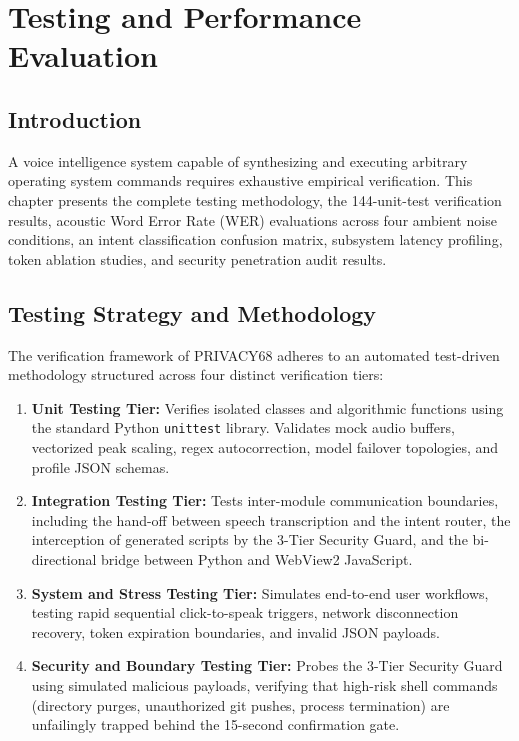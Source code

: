 \chapter{Testing and Performance Evaluation}
\label{ch:testing}

\section{Introduction}
A voice intelligence system capable of synthesizing and executing arbitrary operating system commands requires exhaustive empirical verification. This chapter presents the complete testing methodology, the 144-unit-test verification results, acoustic Word Error Rate (WER) evaluations across four ambient noise conditions, an intent classification confusion matrix, subsystem latency profiling, token ablation studies, and security penetration audit results.

\section{Testing Strategy and Methodology}
The verification framework of PRIVACY68 adheres to an automated test-driven methodology structured across four distinct verification tiers:
\begin{enumerate}
    \item \textbf{Unit Testing Tier:} Verifies isolated classes and algorithmic functions using the standard Python \texttt{unittest} library. Validates mock audio buffers, vectorized peak scaling, regex autocorrection, model failover topologies, and profile JSON schemas.
    \item \textbf{Integration Testing Tier:} Tests inter-module communication boundaries, including the hand-off between speech transcription and the intent router, the interception of generated scripts by the 3-Tier Security Guard, and the bi-directional bridge between Python and WebView2 JavaScript.
    \item \textbf{System and Stress Testing Tier:} Simulates end-to-end user workflows, testing rapid sequential click-to-speak triggers, network disconnection recovery, token expiration boundaries, and invalid JSON payloads.
    \item \textbf{Security and Boundary Testing Tier:} Probes the 3-Tier Security Guard using simulated malicious payloads, verifying that high-risk shell commands (directory purges, unauthorized git pushes, process termination) are unfailingly trapped behind the 15-second confirmation gate.
\end{enumerate}

